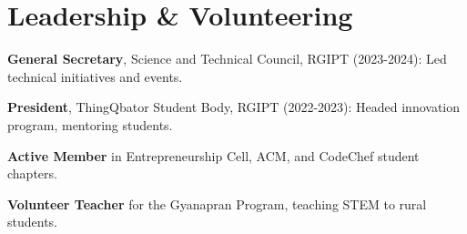 \documentclass[a4paper]{article}
\begin{document}
\section{Leadership \& Volunteering}
\begin{resumeSubHeadingList}
    \item{\textbf{General Secretary}, Science and Technical Council, RGIPT (2023-2024): Led technical initiatives and events.}
    \item{\textbf{President}, ThingQbator Student Body, RGIPT (2022-2023): Headed innovation program, mentoring students.}
    \item{\textbf{Active Member} in Entrepreneurship Cell, ACM, and CodeChef student chapters.}
    \item{\textbf{Volunteer Teacher} for the Gyanapran Program, teaching STEM to rural students.}
\end{resumeSubHeadingList}
\end{document}
